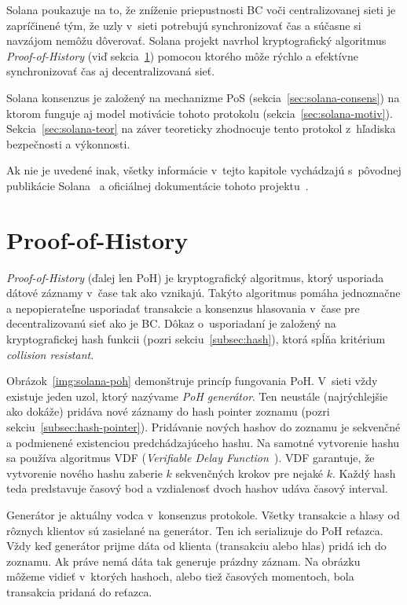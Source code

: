 Solana poukazuje na to, že zníženie priepustnosti BC voči centralizovanej sieti je zapríčinené tým, že uzly v~sieti potrebujú synchronizovať čas a súčasne si navzájom nemôžu dôverovať. Solana projekt navrhol kryptografický algoritmus \textit{Proof-of-History} (viď sekcia~\ref{sec:solana-poh}) pomocou ktorého môže rýchlo a efektívne synchronizovať čas aj decentralizovaná sieť.

Solana konsenzus je založený na mechanizme PoS (sekcia~\ref{sec:solana-consens}) na ktorom funguje aj model motivácie tohoto protokolu (sekcia~\ref{sec:solana-motiv}). Sekcia~\ref{sec:solana-teor} na záver teoreticky zhodnocuje tento protokol z~hľadiska bezpečnosti a výkonnosti.

Ak nie je uvedené inak, všetky informácie v~tejto kapitole vychádzajú s~pôvodnej publikácie Solana~\cite{solanaWp} a oficiálnej dokumentácie tohoto projektu~\cite{solanaDoc}.

\section{Proof-of-History}\label{sec:solana-poh}

\textit{Proof-of-History} (ďalej len PoH) je kryptografický algoritmus, ktorý usporiada dátové záznamy v~čase tak ako vznikajú. Takýto algoritmus pomáha jednoznačne a nepopierateľne usporiadať transakcie a konsenzus hlasovania v~čase pre decentralizovanú sieť ako je BC. Dôkaz o~usporiadaní je založený na kryptografickej hash funkcii (pozri sekciu~\ref{subsec:hash}), ktorá spĺňa kritérium \textit{collision resistant}.

Obrázok~\ref{img:solana-poh} demonštruje princíp fungovania PoH. V~sieti vždy existuje jeden uzol, ktorý nazývame \textit{PoH generátor}. Ten neustále (najrýchlejšie ako dokáže) pridáva nové záznamy do hash pointer zoznamu (pozri sekciu~\ref{subsec:hash-pointer}). Pridávanie nových hashov do zoznamu je sekvenčné a podmienené existenciou predchádzajúceho hashu. Na samotné vytvorenie hashu sa používa algoritmus  VDF (\textit{Verifiable Delay Function~\cite{vdfBoneh}}). VDF garantuje, že vytvorenie nového hashu zaberie $k$ sekvenčných krokov pre nejaké $k$. Každý hash teda predstavuje časový bod a vzdialenosť dvoch hashov udáva časový interval.

Generátor je aktuálny vodca v~konsenzus protokole. Všetky transakcie a hlasy od rôznych klientov sú zasielané na generátor. Ten ich serializuje do PoH reťazca. Vždy keď generátor prijme dáta od klienta (transakciu alebo hlas) pridá ich do zoznamu. Ak práve nemá dáta tak generuje prázdny záznam. Na obrázku môžeme vidieť v~ktorých hashoch, alebo tiež časových momentoch, bola transakcia pridaná do reťazca.

